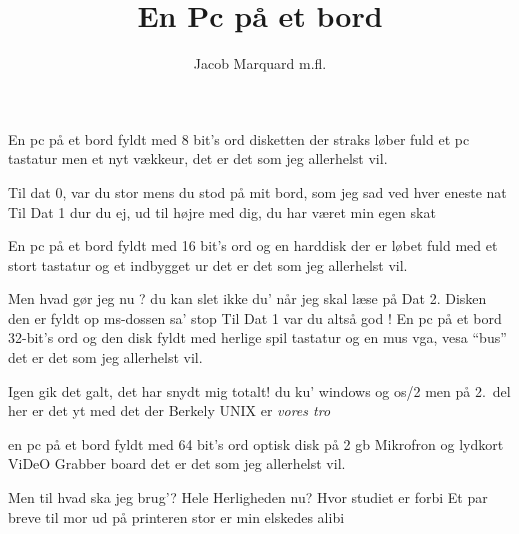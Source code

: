 \documentclass{article}
\title{En Pc på et bord}
\author{Jacob Marquard m.fl.}
\begin{document}

\begin{song}

 En pc på et bord
fyldt med 8 bit's ord
disketten der straks løber fuld
et pc tastatur 
men et nyt vækkeur,
det er det som jeg allerhelst vil.

 Til dat 0, var du stor
        mens du stod på mit bord,
        som jeg sad ved hver eneste nat
        Til Dat 1 dur du ej,
        ud til højre med dig,
        du har været min egen skat

 En pc på et bord
fyldt med 16 bit's ord
og en harddisk der er løbet fuld
med et stort tastatur 
og et indbygget ur
det er det som jeg allerhelst vil.

 Men hvad gør jeg nu ?
        du kan slet ikke du'
        når jeg skal læse på Dat 2.
        Disken den er fyldt op
        {\sc ms}-dossen sa' stop
        Til Dat 1 var du altså god !
\pagebreak[4]
 En pc på et bord
32-bit's ord
og den disk fyldt med herlige spil
tastatur og en mus
vga, vesa ``bus''
det er det som jeg allerhelst vil.

 Igen gik det galt,
        det har snydt mig totalt!
        du ku' windows og {\sc os}/2
        men på 2.~del her
        er det yt med det der
        Berkely UNIX  er {\em vores tro}

 en pc på et bord
fyldt med 64 bit's ord
optisk disk på 2 {\sc gb}
Mikrofron og lydkort
ViDeO Grabber {\sc board}
det er det som jeg allerhelst vil.

 Men til hvad ska jeg brug'?
        Hele Herligheden nu?
        Hvor studiet er forbi
        Et par breve til mor
        ud på printeren stor
        er min elskedes alibi

\end{song}
\end{document}
